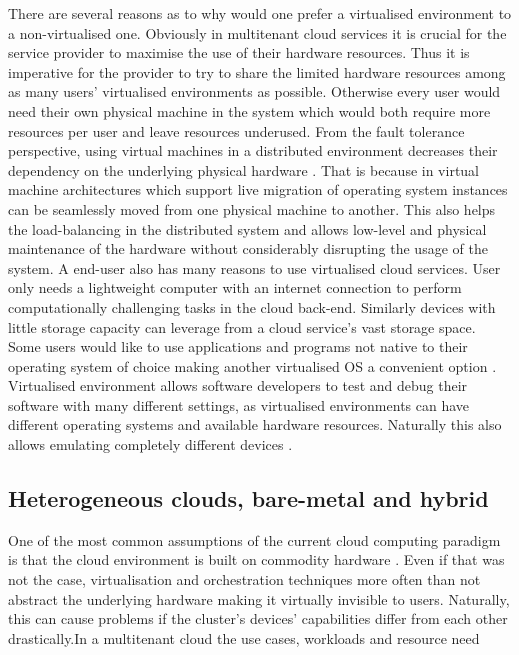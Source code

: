 There are several reasons as to why would one prefer a virtualised environment to a non-virtualised one. Obviously in multitenant cloud services it is crucial for the service provider to maximise the use of their hardware resources. Thus it is imperative for the provider to try to share the limited hardware resources among as many users' virtualised environments as possible. Otherwise every user would need their own physical machine in the system which would both require more resources per user and leave resources underused. From the fault tolerance perspective, using virtual machines in a distributed environment decreases their dependency on the underlying physical hardware \cite{Clark05livemigration}. That is because in virtual machine architectures which support live migration of operating system instances can be seamlessly moved from one physical machine to another. This also helps the load-balancing in the distributed system and allows low-level and physical maintenance of the hardware without considerably disrupting the usage of the system. A end-user also has many reasons to use virtualised cloud services. User only needs a lightweight computer with an internet connection to perform computationally challenging tasks in the cloud back-end. Similarly devices with little storage capacity can leverage from a cloud service's vast storage space. Some users would like to use applications and programs not native to their operating system of choice making another virtualised OS a convenient option \cite{ArpaciDusseau14-Book}. Virtualised environment allows software developers to test and debug their software with many different settings, as virtualised environments can have different operating systems and available hardware resources. Naturally this also allows emulating completely different devices \cite{eder2016hypervisor}.

\subsection{Heterogeneous clouds, bare-metal and hybrid}

One of the most common assumptions of the current cloud computing paradigm is that the cloud environment is built on commodity hardware \cite{Heterogeneous}. Even if that was not the case, virtualisation and orchestration techniques more often than not abstract the underlying hardware making it virtually invisible to users. Naturally, this can cause problems if the cluster's devices' capabilities differ from each other drastically.In a multitenant cloud the use cases, workloads and resource need


	
